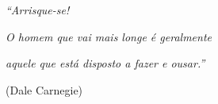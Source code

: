 \begin{epigrafe}
    \vspace*{\fill}
	\begin{flushright}
		\textit{“Arrisque-se!}
		
		\textit{O homem que vai mais longe é geralmente}
		
		\textit{aquele que está disposto a fazer e ousar.”} 
		
		(Dale Carnegie)
	\end{flushright}
\end{epigrafe}